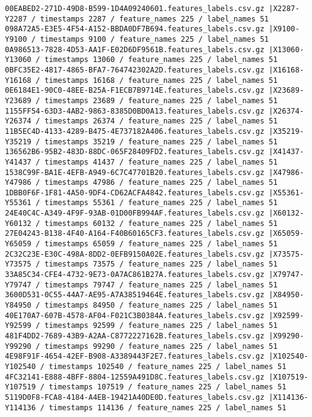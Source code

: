 \documentclass{UoNMCHA}
\numberwithin{equation}{section}
\begin{document}
\begin{lstlisting}
00EABED2-271D-49D8-B599-1D4A09240601.features_labels.csv.gz |X2287-Y2287 / timestamps 2287 / feature_names 225 / label_names 51
098A72A5-E3E5-4F54-A152-BBDA0DF7B694.features_labels.csv.gz |X9100-Y9100 / timestamps 9100 / feature_names 225 / label_names 51
0A986513-7828-4D53-AA1F-E02D6DF9561B.features_labels.csv.gz |X13060-Y13060 / timestamps 13060 / feature_names 225 / label_names 51
0BFC35E2-4817-4865-BFA7-764742302A2D.features_labels.csv.gz |X16168-Y16168 / timestamps 16168 / feature_names 225 / label_names 51
0E6184E1-90C0-48EE-B25A-F1ECB7B9714E.features_labels.csv.gz |X23689-Y23689 / timestamps 23689 / feature_names 225 / label_names 51
1155FF54-63D3-4AB2-9863-8385D0BD0A13.features_labels.csv.gz |X26374-Y26374 / timestamps 26374 / feature_names 225 / label_names 51
11B5EC4D-4133-4289-B475-4E737182A406.features_labels.csv.gz |X35219-Y35219 / timestamps 35219 / feature_names 225 / label_names 51
136562B6-95B2-483D-88DC-065F28409FD2.features_labels.csv.gz |X41437-Y41437 / timestamps 41437 / feature_names 225 / label_names 51
1538C99F-BA1E-4EFB-A949-6C7C47701B20.features_labels.csv.gz |X47986-Y47986 / timestamps 47986 / feature_names 225 / label_names 51
1DBB0F6F-1F81-4A50-9DF4-CD62ACFA4842.features_labels.csv.gz |X55361-Y55361 / timestamps 55361 / feature_names 225 / label_names 51
24E40C4C-A349-4F9F-93AB-01D00FB994AF.features_labels.csv.gz |X60132-Y60132 / timestamps 60132 / feature_names 225 / label_names 51
27E04243-B138-4F40-A164-F40B60165CF3.features_labels.csv.gz |X65059-Y65059 / timestamps 65059 / feature_names 225 / label_names 51
2C32C23E-E30C-498A-8DD2-0EFB9150A02E.features_labels.csv.gz |X73575-Y73575 / timestamps 73575 / feature_names 225 / label_names 51
33A85C34-CFE4-4732-9E73-0A7AC861B27A.features_labels.csv.gz |X79747-Y79747 / timestamps 79747 / feature_names 225 / label_names 51
3600D531-0C55-44A7-AE95-A7A38519464E.features_labels.csv.gz |X84950-Y84950 / timestamps 84950 / feature_names 225 / label_names 51
40E170A7-607B-4578-AF04-F021C3B0384A.features_labels.csv.gz |X92599-Y92599 / timestamps 92599 / feature_names 225 / label_names 51
481F4DD2-7689-43B9-A2AA-C8772227162B.features_labels.csv.gz |X99290-Y99290 / timestamps 99290 / feature_names 225 / label_names 51
4E98F91F-4654-42EF-B908-A3389443F2E7.features_labels.csv.gz |X102540-Y102540 / timestamps 102540 / feature_names 225 / label_names 51
4FC32141-E888-4BFF-8804-12559A491D8C.features_labels.csv.gz |X107519-Y107519 / timestamps 107519 / feature_names 225 / label_names 51
5119D0F8-FCA8-4184-A4EB-19421A40DE0D.features_labels.csv.gz |X114136-Y114136 / timestamps 114136 / feature_names 225 / label_names 51

\end{lstlisting}
\end{document}
